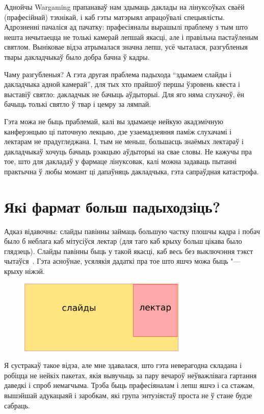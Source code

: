 \documentclass[10pt, a5paper]{article}
\begin{document}
Аднойчы Wargaming прапанаваў нам здымаць даклады на лінуксоўках сваёй (прафесійнай) тэхнікай, і каб гэты матэрыял апрацоўвалі спецыялісты. Адрозненні пачаліся ад пачатку: прафесіяналы вырашылі праблему з тым што нешта нечытаецца не толькі камерай лепшай якасці, але і правільна пастаўленым святлом. Выніковае відэа атрымалася значна лепш, усё чыталася, разгубленыя твары дакладчыкаў было добра бачна ў кадры.

Чаму разгубленыя? А гэта другая праблема падыхода ``здымаем слайды і дакладчыка адной камерай'', для тых хто прайшоў першы ўзровень квеста і выставіў святло: дакладчык не бачыць аўдыторыі. Для яго няма слухачоў, ён бачыць толькі святло ў твар і цемру за лямпай.

Гэта можа не быць праблемай, калі вы здымаеце нейкую акадэмічную канферэнцыю ці паточную лекцыю, дзе узаемадзеяння паміж слухачамі і лектарам не прадугледжана. І, тым не меньш, большасць знаёмых лектараў і дакладчыкаў хочуць бачыць рэакцыю аўдыторыі на свае словы. Не кажучы пра тое, што для дакладаў у фармаце лінуксовак, калі можна задаваць пытанні практычна ў любы момант ці дапаўняць дакладчыка, гэта сапраўдная катастрофа.

\section*{Які фармат больш падыходзіць?}

Адказ відавочны: слайды павінны займаць большую частку \linebreak плошчы кадра і побач было б неблага каб мітусіўся лектар (для таго каб крыху больш цікава было глядзець). Слайды павінны быць у такой якасці, каб весь без выключэння тэкст чытаўся~\cite{Zakharevich2}. Гэта асноўнае, усялякія дадаткі пра тое што яшчэ можа быць "--- крыху ніжэй.

\begin{figure}[h!]
  \centering
  \includegraphics[width=8cm]{32_2016_Zakharevich2.png}
\end{figure}

Я сустракаў такое відэа, але мне здавалася, што гэта неверагодна складана і робіцца не нейкіх пакетах, якія вывучыць за пару вечароў неўважлівага гартання даведкі і спроб немагчыма. Трэба быць прафесіяналам і лепш яшчэ і са стажам, вышэйшай адукацыяй і заробкам, які група энтузіястаў проста не ў стане будзе сабраць.
\end{document}
